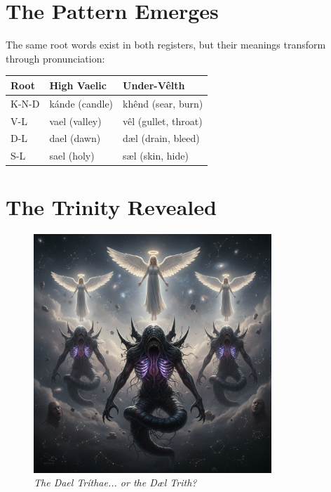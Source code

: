 \documentclass[11pt,a4paper,twoside]{book}
\begin{document}
\section{The Pattern Emerges}

\begin{tcolorbox}[codexbox={Linguistic Observation}]
The same root words exist in both registers, but their meanings transform through pronunciation:

\begin{tabular}{lll}
\textbf{Root} & \textbf{High Vaelic} & \textbf{Under-Vêlth} \\
\hline
K-N-D & kánde (candle) & khênd (sear, burn) \\
V-L & vael (valley) & vêl (gullet, throat) \\
D-L & dael (dawn) & dæl (drain, bleed) \\
S-L & sael (holy) & sæl (skin, hide) \\
\end{tabular}
\end{tcolorbox}

\section{The Trinity Revealed}

\begin{figure}[h]
\centering
\includegraphics[width=0.8\textwidth]{images/dael_trithae_horror_2025-09-03T22-22-42-860Z_1.png}
\caption*{\textit{The Dael Tríthae... or the Dæl Trith?}}
\end{figure}
\end{document}
